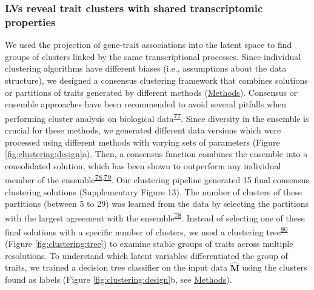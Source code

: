\documentclass[
  a4paper,
]{article}
\begin{document}
\hypertarget{lvs-reveal-trait-clusters-with-shared-transcriptomic-properties}{%
\subsubsection{LVs reveal trait clusters with shared transcriptomic properties}\label{lvs-reveal-trait-clusters-with-shared-transcriptomic-properties}}

We used the projection of gene-trait associations into the latent space to find groups of clusters linked by the same transcriptional processes.
Since individual clustering algorithms have different biases (i.e., assumptions about the data structure), we designed a consensus clustering framework that combines solutions or partitions of traits generated by different methods (\protect\hyperlink{sec:methods:clustering}{Methods}).
Consensus or ensemble approaches have been recommended to avoid several pitfalls when performing cluster analysis on biological data\textsuperscript{\protect\hyperlink{ref-14dCeRkua}{77}}.
Since diversity in the ensemble is crucial for these methods, we generated different data versions which were processed using different methods with varying sets of parameters (Figure \ref{fig:clustering:design}a).
Then, a consensus function combines the ensemble into a consolidated solution, which has been shown to outperform any individual member of the ensemble\textsuperscript{\protect\hyperlink{ref-uw3AnEgA}{78},\protect\hyperlink{ref-cuROQDFa}{79}}.
Our clustering pipeline generated 15 final consensus clustering solutions (Supplementary Figure 13).
The number of clusters of these partitions (between 5 to 29) was learned from the data by selecting the partitions with the largest agreement with the ensemble\textsuperscript{\protect\hyperlink{ref-uw3AnEgA}{78}}.
Instead of selecting one of these final solutions with a specific number of clusters, we used a clustering tree\textsuperscript{\protect\hyperlink{ref-xhtEAzx6}{80}} (Figure \ref{fig:clustering:tree}) to examine stable groups of traits across multiple resolutions.
To understand which latent variables differentiated the group of traits, we trained a decision tree classifier on the input data \(\hat{\mathbf{M}}\) using the clusters found as labels (Figure \ref{fig:clustering:design}b, see \protect\hyperlink{sec:methods:clustering}{Methods}).
\end{document}
